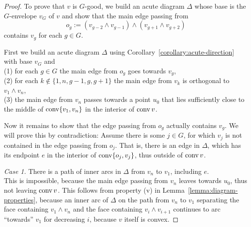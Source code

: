 \begin{proof}
  To prove that $v$ is $G$-good, we build an acute diagram $\Delta$ whose base is the $G$-envelope $v_G$ of $v$ and show that the main edge passing from $$o_g := (v_{g-2} \wedge v_{g-1}) \wedge (v_{g+1} \wedge v_{g+2})$$ contains $v_g$ for each $g \in G$.

  First we build an acute diagram $\Delta$ using Corollary~\ref{corollary:acute-direction} with base $v_G$ and\\
  (1) for each $g \in G$ the main edge from $o_g$ goes towards $v_g$,\\
  (2) for each $k \notin \{1,n,g-1,g,g+1\}$ the main edge from $v_k$ is orthogonal to $v_1 \wedge v_n$,\\
  (3) the main edge from $v_n$ passes towards a point $u_0$ that lies sufficiently close to the middle of $\operatorname{conv} \{v_1,v_n\}$ in the interior of $\operatorname{conv} v$.

  Now it remains to show that the edge passing from $o_g$ actually contains $v_g$. We will prove this by contradiction: Assume there is some $j \in G$, for which $v_j$ is not contained in the edge passing from $o_j$. That is, there is an edge in $\Delta$, which has its endpoint $e$ in the interior of $\operatorname{conv} \{o_j, v_j\}$, thus outside of $\operatorname{conv} v$.

  \textit{Case 1.} There is a path of inner arcs in $\Delta$ from $v_n$ to $v_1$, including $e$.\\
  This is impossible, because the main edge passing from $v_n$ leaves towards $u_0$, thus not leaving $\operatorname{conv} v$. This follows from property (v) in Lemma~\ref{lemma:diagram-properties}, because an inner arc of $\Delta$ on the path from $v_n$ to $v_1$ separating the face containing $v_1 \wedge v_n$ and the face containing $v_i \wedge v_{i+1}$ continues to arc ``towards'' $v_1$ for decreasing $i$, because $v$ itself is convex.


\end{proof}
